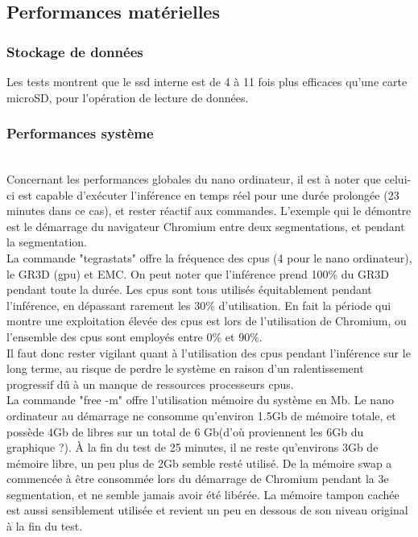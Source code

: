 ﻿\subsection{Performances matérielles}
\subsubsection{Stockage de données}
\noindent Les tests montrent que le \acrshort{ssd} interne est de 4 à 11 fois plus efficaces qu'une carte microSD, pour l'opération de lecture de données. 
\subsubsection{Performances système}
\vspace{\baselineskip}
\\
\noindent Concernant les performances globales du nano ordinateur, il est à noter que celui-ci est capable d'exécuter l'inférence en temps réel pour une durée prolongée (23 minutes dans ce cas), et rester réactif aux commandes. L'exemple qui le démontre est le démarrage du navigateur Chromium entre deux segmentations, et pendant la segmentation.
\vspace{\baselineskip}
\\
\noindent La commande "tegrastats" offre la fréquence des \acrshort{cpu}s (4 pour le nano ordinateur), le GR3D (\acrshort{gpu}) et EMC. On peut noter que l'inférence prend 100\% du GR3D pendant toute la durée. Les \acrshort{cpu}s sont tous utilisés équitablement pendant l'inférence, en dépassant rarement les 30\% d'utilisation. En fait la période qui montre une exploitation élevée des \acrshort{cpu}s est lors de l'utilisation de Chromium, ou l'ensemble des \acrshort{cpu}s sont employés entre 0\% et 90\%. 
\vspace{\baselineskip}
\\
\noindent Il faut donc rester vigilant quant à l'utilisation des \acrshort{cpu}s pendant l'inférence sur le long terme, au risque de perdre le système en raison d'un ralentissement progressif dû à un manque de ressources processeurs \acrshort{cpu}s.
\vspace{\baselineskip}
\\
\noindent La commande "free -m" offre l'utilisation mémoire du système en Mb. Le nano ordinateur au démarrage ne consomme qu'environ 1.5Gb de mémoire totale, et possède 4Gb de libres sur un total de 6 Gb(d'où proviennent les 6Gb du graphique ?). À la fin du test de 25 minutes, il ne reste qu'environs 3Gb de mémoire libre, un peu plus de 2Gb semble resté utilisé. De la mémoire swap a commencée à être consommée lors du démarrage de Chromium pendant la 3e segmentation, et ne semble jamais avoir été libérée. La mémoire tampon cachée est aussi sensiblement utilisée et revient un peu en dessous de son niveau original à la fin du test. 
